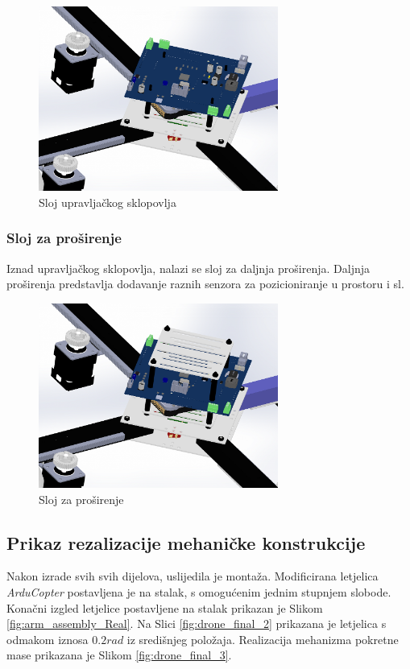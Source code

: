 \documentclass[11pt,a4paper]{article}
\begin{document}
\begin{figure}[H]
	\centering
	\includegraphics[width=0.7\textwidth]{figures/arducopter_slot_pcb.png}
	\caption{Sloj upravljačkog sklopovlja}
	\label{fig:slot_pcb}
\end{figure}

\subsubsection{Sloj za proširenje}
Iznad upravljačkog sklopovlja, nalazi se sloj za daljnja proširenja. Daljnja proširenja predstavlja dodavanje raznih senzora za pozicioniranje u prostoru i sl. 

\begin{figure}[H]
	\centering
	\includegraphics[width=0.7\textwidth]{figures/arducopter_slot_top.png}
	\caption{Sloj za proširenje}
	\label{fig:slot_top}
\end{figure}

\subsection{Prikaz rezalizacije mehaničke konstrukcije}
Nakon izrade svih svih dijelova, uslijedila je montaža. Modificirana letjelica \textit{ArduCopter} postavljena je na stalak, s omogućenim jednim stupnjem slobode. Konačni izgled letjelice postavljene na stalak prikazan je Slikom \ref{fig:arm_assembly_Real}. Na Slici \ref{fig:drone_final_2} prikazana je letjelica s odmakom iznosa $0.2 rad$ iz središnjeg položaja. Realizacija mehanizma pokretne mase prikazana je Slikom \ref{fig:drone_final_3}.
\end{document}

